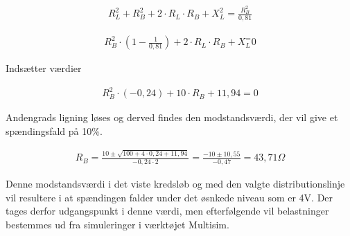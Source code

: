 \begin{align}
R_L^2+R_B^2+2\cdot R_L\cdot R_B+X_L^2=\frac{R_B^2}{0,81}
\end{align}

\begin{align}
R_B^2\cdot (1-\frac{1}{0,81})+2\cdot R_L\cdot R_B+X_L^=0
\end{align}

Indsætter værdier

\begin{align}
R_B^2\cdot (-0,24) +10\cdot R_B+11,94=0
\end{align}

Andengrads ligning løses og derved findes den modstandsværdi, der vil give et spændingsfald på 10\%.

\begin{align}
R_B=\frac{10\pm\sqrt{100+4\cdot 0,24+11,94}}{-0,24\cdot 2}=\frac{-10\pm 10,55}{-0,47}=43,71 \Omega
\end{align}

Denne modstandsværdi i det viste kredsløb og med den valgte distributionslinje vil resultere i at spændingen falder under det øsnkede niveau som er 4V. Der tages derfor udgangspunkt i denne værdi, men efterfølgende vil belastninger bestemmes ud fra simuleringer i værktøjet Multisim. 



